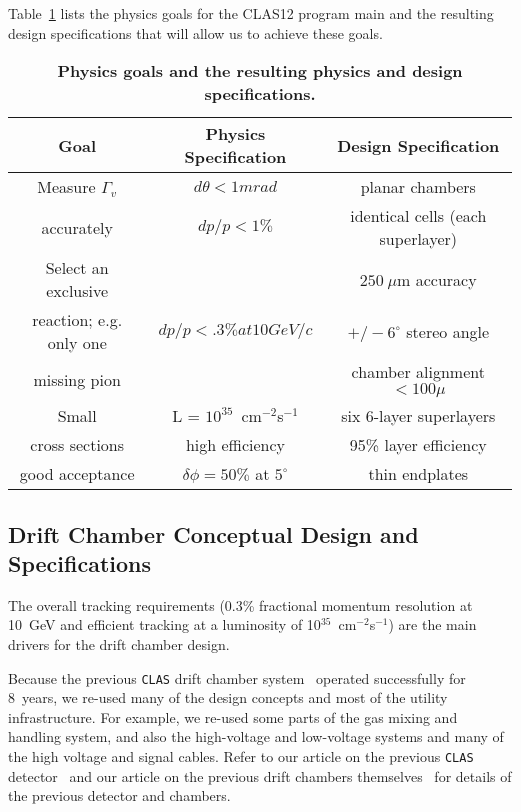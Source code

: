 Table~\ref{fwd-dc-physics-specifications} lists the physics goals for the CLAS12 program
main and the resulting design specifications that will allow us to achieve these goals.

\small{
\begin{table}[ht]
\begin{center}
\begin{tabular}{||c|c|c||} \hline \hline
   {\bf Goal}         & {\bf Physics Specification} & {\bf Design Specification}\\ \hline
Measure $\Gamma_v$  & $d \theta < 1mrad$   & planar chambers \\ 
accurately  & $dp/p < 1\% $ & identical cells (each superlayer)  \\ \hline
Select an exclusive  &    & $250~\mu$m  accuracy \\ 
reaction; e.g. only one    & $dp/p < .3\% at 10 GeV/c$ &    $+/- 6^\circ$ stereo angle  \\ 
missing pion       & & chamber alignment $<100\mu$ \\ \hline
Small       & L = $10^{35}$~cm$^{-2}$s$^{-1}$  & six 6-layer superlayers \\ 
cross sections  & high efficiency & 95\% layer efficiency \\ \hline
good acceptance   & $\delta\phi = 50\%$ at $5^\circ$ & thin endplates\\ \hline
\end{tabular}
\caption{\small{\bf Physics goals and the resulting physics and design specifications.}}
\label{fwd-dc-physics-specifications}
\end{center}
\end{table}
}

\subsection{Drift Chamber Conceptual Design and Specifications}

The overall tracking requirements (0.3\% fractional momentum resolution 
at 10~GeV and efficient tracking at a luminosity of 
10$^{35}$~cm$^{-2}$s$^{-1}$) are the main drivers for the drift chamber design.  

Because the previous {\tt CLAS} drift chamber system~\cite{dcnim} operated 
successfully for 8~years, we re-used many of the design concepts and 
most of the utility infrastructure.  For example, we re-used some
parts of the gas mixing and handling system, and also the high-voltage 
and low-voltage systems and many of the high voltage and signal cables. 
Refer to our 
article on the previous {\tt CLAS} detector~\cite{clasnim} and our article 
on the previous drift chambers themselves~\cite{dcnim} for details of the 
previous detector and chambers.  

